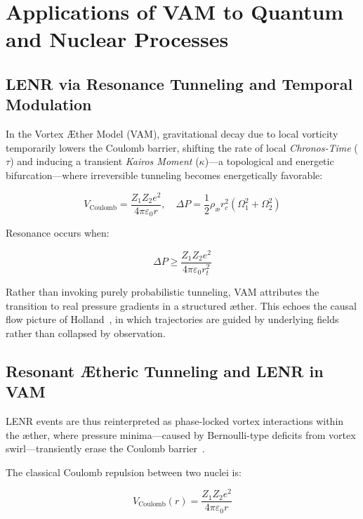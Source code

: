 \section{Applications of VAM to Quantum and Nuclear Processes}
\label{sec:LENR_QED}

\subsection*{LENR via Resonance Tunneling and Temporal Modulation}

In the Vortex Æther Model (VAM), gravitational decay due to local vorticity temporarily lowers the Coulomb barrier, shifting the rate of local \emph{Chronos-Time} (\(\tau\)) and inducing a transient \emph{Kairos Moment} (\(\kappa\))—a topological and energetic bifurcation—where irreversible tunneling becomes energetically favorable:

\begin{equation}
    V_\text{Coulomb} = \frac{Z_1 Z_2 e^2}{4\pi \varepsilon_0 r}, \quad
    \Delta P = \frac{1}{2} \rho_\text{\ae} r_c^2 (\Omega_1^2 + \Omega_2^2)
\end{equation}

Resonance occurs when:

\begin{equation}
    \Delta P \geq \frac{Z_1 Z_2 e^2}{4\pi \varepsilon_0 r_t^2}
\end{equation}

Rather than invoking purely probabilistic tunneling, VAM attributes the transition to real pressure gradients in a structured æther. This echoes the causal flow picture of Holland~\cite{holland1993quantum}, in which trajectories are guided by underlying fields rather than collapsed by observation.

\subsection*{Resonant Ætheric Tunneling and LENR in VAM}

LENR events are thus reinterpreted as phase-locked vortex interactions within the æther, where pressure minima—caused by Bernoulli-type deficits from vortex swirl—transiently erase the Coulomb barrier~\cite{Barcelo2011,volovik2003}.

The classical Coulomb repulsion between two nuclei is:

\begin{equation}
    V_\text{Coulomb}(r) = \frac{Z_1 Z_2 e^2}{4\pi \varepsilon_0 r}
\end{equation}

